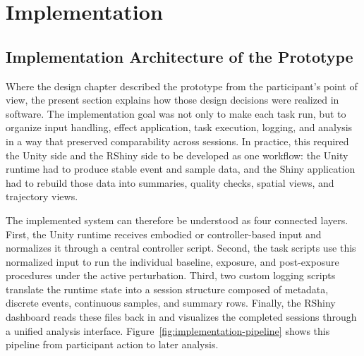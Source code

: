 \chapter{Implementation}
\label{chap:implementation}

\section{Implementation Architecture of the Prototype}
\label{sec:implementation-architecture}

Where the design chapter described the prototype from the participant's point of view, the present section explains how those design decisions were realized in software. The implementation goal was not only to make each task run, but to organize input handling, effect application, task execution, logging, and analysis in a way that preserved comparability across sessions. In practice, this required the Unity side and the RShiny side to be developed as one workflow: the Unity runtime had to produce stable event and sample data, and the Shiny application had to rebuild those data into summaries, quality checks, spatial views, and trajectory views.

The implemented system can therefore be understood as four connected layers. First, the Unity runtime receives embodied or controller-based input and normalizes it through a central controller script. Second, the task scripts use this normalized input to run the individual baseline, exposure, and post-exposure procedures under the active perturbation. Third, two custom logging scripts translate the runtime state into a session structure composed of metadata, discrete events, continuous samples, and summary rows. Finally, the RShiny dashboard reads these files back in and visualizes the completed sessions through a unified analysis interface. Figure~\ref{fig:implementation-pipeline} shows this pipeline from participant action to later analysis.

